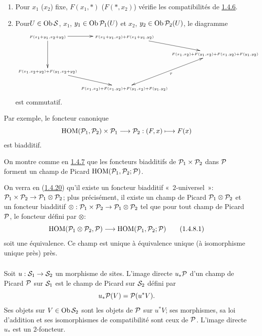 \documentclass[10pt]{../fichiers-configuration-latex/smfart}
\begin{document}
\begin{enumerate}
\renewcommand{\theenumi}{\alph{enumi}}
\renewcommand{\labelenumi}{\theenumi)}
\item Pour $x_{1}$ (\resp $x_{2}$) fixe, $F(x_{1},\ast)$
(\resp $F(\ast,x_{2})$) vérifie les compatibilités de
  \hyperref[XVIII.subsubsec1.4.6]{1.4.6}. 

\item Pour\pageoriginale $U\in \operatorname{Ob} {\mathcal S}$, $x_{1}$, $y_{1}\in
\operatorname{Ob} {\mathcal P}_{1}(U)$ et $x_{2}$, $y_{2}\in \operatorname{Ob} {\mathcal P}_{2}(U)$,
le diagramme
$$
\xymatrix@C=0cm@R=.5cm{
\scriptscriptstyle{F(x_1+y_1, x_2+y_2)}\ar[dd] \ar[r] &\scriptscriptstyle{F(x_1+y_1, x_2) + F(x_1+y_1,y_2)}\ar[rd]\\
 & &\scriptscriptstyle{F(x_1,x_2) + F(y_1,x_2) +F(x_1,y_2)+F(y_1,y_2)}\\
\scriptscriptstyle{F(x_1,x_2+y_2) + F(y_1,x_2+y_2)}\ar[rd] \\
& \scriptscriptstyle{F(x_1,x_2)+F(x_1,y_2) + F(y_1,x_2)+F(y_1,y_2)}\ar@{<->}[ruu]_{\tau}
}
$$
est commutatif.
\end{enumerate}

Par exemple, le foncteur canonique
$$
\operatorname{HOM}({\mathcal P}_{1},{\mathcal P}_{2})\times
{\mathcal P}_{1}\longrightarrow {\mathcal P}_{2}:(F,x)\longmapsto F(x)
$$
est biadditif.

On montre comme en \hyperref[XVIII.subsubsec1.4.7]{1.4.7} que les foncteurs biadditifs de
${\mathcal P}_{1}\times {\mathcal P}_{2}$ dans ${\mathcal P}$ forment un
champ de Picard $\operatorname{HOM}({\mathcal P}_{1}, {\mathcal P}_{2};{\mathcal P})$.

On verra en (\hyperref[XVIII.const1.4.20]{1.4.20}) qu'il existe un foncteur biadditif « $2$-universel »: ${\mathcal P}_{1}\times {\mathcal P}_{2}\rightarrow
{\mathcal P}_{1}\otimes {\mathcal P}_{2}$; plus précisément, il existe
un champ de Picard ${\mathcal P}_{1}\otimes {\mathcal P}_{2}$ et un
foncteur biadditif $\otimes:{\mathcal P}_{1}\times
{\mathcal P}_{2}\rightarrow {\mathcal P}_{1}\otimes {\mathcal P}_{2}$ tel
que pour tout champ de Picard ${\mathcal P}$, le foncteur défini par
$\otimes$:
\begin{equation*}
\operatorname{HOM}({\mathcal P}_{1}\otimes {\mathcal P}_{2},{\mathcal P})\longrightarrow \operatorname{HOM} ({\mathcal P}_{1},{\mathcal P}_{2};{\mathcal P})\tag{1.4.8.1}
\end{equation*}%
soit une équivalence. Ce champ est unique à équivalence unique (à
isomorphisme unique près) près.

\subsubsection{}
Soit $u:{\mathcal S}_{1}\rightarrow {\mathcal S}_{2}$ un morphisme de
sites. L'image directe $u_{\ast}{\mathcal P}$ d'un champ de
Picard ${\mathcal P}$ sur ${\mathcal S}_{1}$ est le champ de Picard sur
${\mathcal S}_{2}$ défini par
$$
u_{\ast}{\mathcal P}(V)={\mathcal P}(u^{\ast}V){}.
$$
Ses objets sur $V\in \operatorname{Ob} {\mathcal S}_{2}$ sont les objets de
${\mathcal P}$ sur $u^{\ast}V$; ses morphismes, sa loi d'addition et
ses isomorphismes de compatibilité sont ceux de ${\mathcal P}$. L'image
directe $u_{\ast}$ est un $2$-foncteur.
\end{document}
